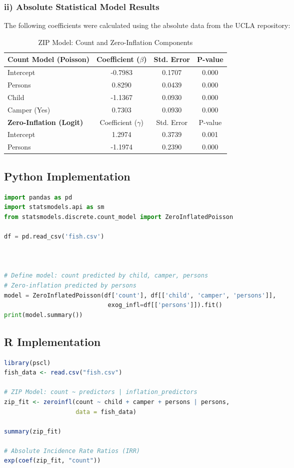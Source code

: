 \documentclass[12pt]{article}
\begin{document}
\subsubsection{ii) Absolute Statistical Model Results}
The following coefficients were calculated using the absolute data from the UCLA repository:

\begin{table}[h!]
\centering
\caption{ZIP Model: Count and Zero-Inflation Components}
\begin{tabular}{@{}lccc@{}}
\toprule
\textbf{Count Model (Poisson)} & Coefficient ($\beta$) & Std. Error & P-value \\ \midrule
Intercept & -0.7983 & 0.1707 & 0.000 \\
Persons & 0.8290 & 0.0439 & 0.000 \\
Child & -1.1367 & 0.0930 & 0.000 \\
Camper (Yes) & 0.7303 & 0.0930 & 0.000 \\ \midrule
\textbf{Zero-Inflation (Logit)} & Coefficient ($\gamma$) & Std. Error & P-value \\ \midrule
Intercept & 1.2974 & 0.3739 & 0.001 \\
Persons & -1.1974 & 0.2390 & 0.000 \\ \bottomrule
\end{tabular}
\end{table}


\subsection{Python Implementation}
\begin{lstlisting}[language=Python, caption=Python Zero-Inflated Poisson]
import pandas as pd
import statsmodels.api as sm
from statsmodels.discrete.count_model import ZeroInflatedPoisson

df = pd.read_csv('fish.csv')



# Define model: count predicted by child, camper, persons
# Zero-inflation predicted by persons
model = ZeroInflatedPoisson(df['count'], df[['child', 'camper', 'persons']], 
                             exog_infl=df[['persons']]).fit()
print(model.summary())
\end{lstlisting}

\subsection{R Implementation}
\begin{lstlisting}[language=R, caption=R Zero-Inflated Poisson]
library(pscl)
fish_data <- read.csv("fish.csv")

# ZIP Model: count ~ predictors | inflation_predictors
zip_fit <- zeroinfl(count ~ child + camper + persons | persons, 
                    data = fish_data)

summary(zip_fit)

# Absolute Incidence Rate Ratios (IRR)
exp(coef(zip_fit, "count"))
\end{lstlisting}
\end{document}
